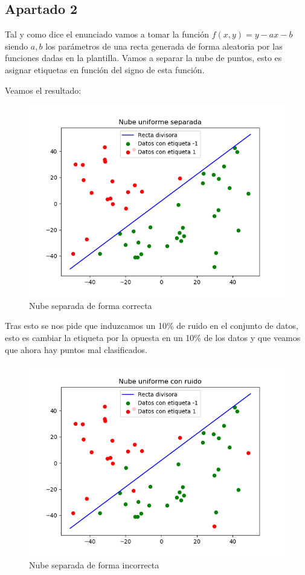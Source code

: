 \documentclass[12pt,a4paper]{article}
\begin{document}
\subsection{Apartado 2}

Tal y como dice el enunciado vamos a tomar la función $f(x,y) = y-ax-b$ siendo $a,b$ los parámetros de una recta generada de forma aleatoria por las funciones dadas en la plantilla. Vamos a separar la nube de puntos, esto es asignar etiquetas en función del signo de esta función.

Veamos el resultado:

\begin{figure}[H]
	\centering
	\includegraphics[scale=0.8]{./Imagenes/ej1-3.png}
	\caption{Nube separada de forma correcta}
\end{figure}

Tras esto se nos pide que induzcamos un 10\% de ruido en el conjunto de datos, esto es cambiar la etiqueta por la opuesta en un 10\% de los datos y que veamos que ahora hay puntos mal clasificados.

\begin{figure}[H]
	\centering
	\includegraphics[scale=0.8]{./Imagenes/ej1-4.png}
	\caption{Nube separada de forma incorrecta}
\end{figure}
\end{document}
